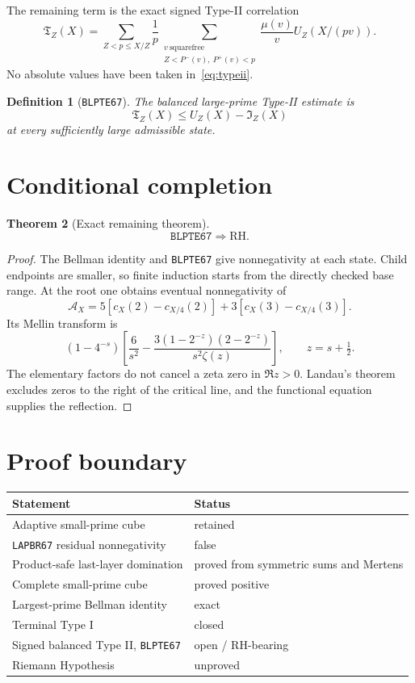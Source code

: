 \documentclass[11pt]{article}
\newtheorem{theorem}{Theorem}[section]
\newtheorem{definition}[theorem]{Definition}
\newcommand{\1}{\mathbf 1}
\newcommand{\RH}{\mathrm{RH}}
\begin{document}
The remaining term is the exact signed Type-II correlation
\begin{equation}\label{eq:typeii}
 \mathfrak T_Z(X)=
 \sum_{Z<p\le X/Z}\frac1p
 \sum_{\substack{v\ \mathrm{squarefree}\\Z<P^-(v),\ P^+(v)<p}}
 \frac{\mu(v)}vU_Z(X/(pv)).
\end{equation}
No absolute values have been taken in~\eqref{eq:typeii}.

\begin{definition}[\texttt{BLPTE67}]
The balanced large-prime Type-II estimate is
\[
 \boxed{\mathfrak T_Z(X)\le U_Z(X)-\mathfrak I_Z(X)}
\]
at every sufficiently large admissible state.
\end{definition}

\section{Conditional completion}
\begin{theorem}[Exact remaining theorem]\label{thm:conditional}
\[
 \texttt{BLPTE67}\Longrightarrow\RH.
\]
\end{theorem}
\begin{proof}
The Bellman identity and \texttt{BLPTE67} give nonnegativity at each state.
Child endpoints are smaller, so finite induction starts from the directly
checked base range.  At the root one obtains eventual nonnegativity of
\[
 \mathcal A_X=5[c_X(2)-c_{X/4}(2)]+3[c_X(3)-c_{X/4}(3)].
\]
Its Mellin transform is
\[
 (1-4^{-s})\left[\frac6{s^2}-
 \frac{3(1-2^{-z})(2-2^{-z})}{s^2\zeta(z)}\right],
 \qquad z=s+\tfrac12.
\]
The elementary factors do not cancel a zeta zero in $\Re z>0$.  Landau's
theorem excludes zeros to the right of the critical line, and the functional
equation supplies the reflection.
\end{proof}

\section{Proof boundary}
\begin{longtable}{p{}p{}}
\toprule
Statement & Status\\
\midrule
Adaptive small-prime cube & retained\\
\texttt{LAPBR67} residual nonnegativity & false\\
Product-safe last-layer domination & proved from symmetric sums and Mertens\\
Complete small-prime cube & proved positive\\
Largest-prime Bellman identity & exact\\
Terminal Type I & closed\\
Signed balanced Type II, \texttt{BLPTE67} & open / RH-bearing\\
Riemann Hypothesis & unproved\\
\bottomrule
\end{longtable}
\end{document}

